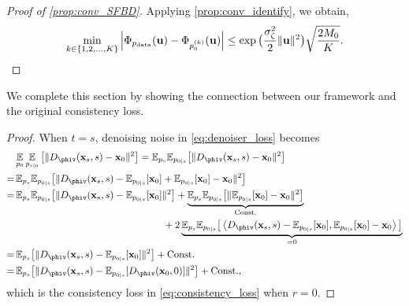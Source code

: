 \begin{proof}[Proof of \cref{prop:conv_SFBD}]
Applying \cref{prop:conv_identify}, we obtain,
\begin{align}
			\min_{k \in \{1, 2, \ldots, K\}} \left|\Phi_{p_\text{data}}(\mathbf{u}) - \Phi_{p_0^{(k)}}(\mathbf{u})\right|\leq \exp \big(\frac{\sigma_\zeta^2}{2} \|\mathbf{u}\|^2 \big) \sqrt{\frac{2 M_0}{K}}.
\end{align}
\end{proof}

We complete this section by showing the connection between our framework and the original consistency loss. 
\RELCONSSFBD*
\begin{proof}
	When $t = s$, denoising noise in \cref{eq:denoiser_loss} becomes	
	\begin{align*}
	 &\underset{p_0}{\Eb} \,  \underset{p_{s|0}}{\Eb} \left[\|D_{\phiv}(\xv_s, s) - \xv_0 \|^2 \right] = \Eb_{p_s} \Eb_{p_{0|s}}\big[ \|D_{\phiv}(\xv_s, s) - \xv_0 \|^2  \big] \\
	 =\, & \Eb_{p_s} \Eb_{p_{0|s}}\big[ \|D_{\phiv}(\xv_s, s) - \Eb_{p_{0|s}}[\xv_0] + \Eb_{p_{0|s}}[\xv_0] - \xv_0 \|^2  \big] \\
	 =\, & \Eb_{p_s} \Eb_{p_{0|s}}\big[\|D_{\phiv}(\xv_s, s) - \Eb_{p_{0|s}}[\xv_0]  \|^2 \big] + \underbrace{\Eb_{p_s} \Eb_{p_{0|s}}\big[\|\Eb_{p_{0|s}}[\xv_0]  - \xv_0\|^2 \big]}_{\text{Const.}}  \\
	 &\hspace{15em} + 2 \underbrace{\Eb_{p_s} \Eb_{p_{0|s}}\big[\inner{D_{\phiv}(\xv_s, s) - \Eb_{p_{0|s}}[\xv_0]}{\Eb_{p_{0|s}}[\xv_0] - \xv_0} \big]}_{=0} \\
	 =\, & \Eb_{p_s}\big[\|D_{\phiv}(\xv_s, s) - \Eb_{p_{0|s}}[\xv_0]  \|^2 \big] + \textrm{Const.} \\
	 =\, & \Eb_{p_s} \big[\|D_{\phiv}(\xv_s, s) - \Eb_{p_{0|s}}[D_{\phiv}(\xv_0, 0)]  \|^2 \big] + \textrm{Const.},
	 \end{align*}
	 which is the consistency loss in \cref{eq:consistency_loss} when $r = 0$. 
\end{proof}
 





